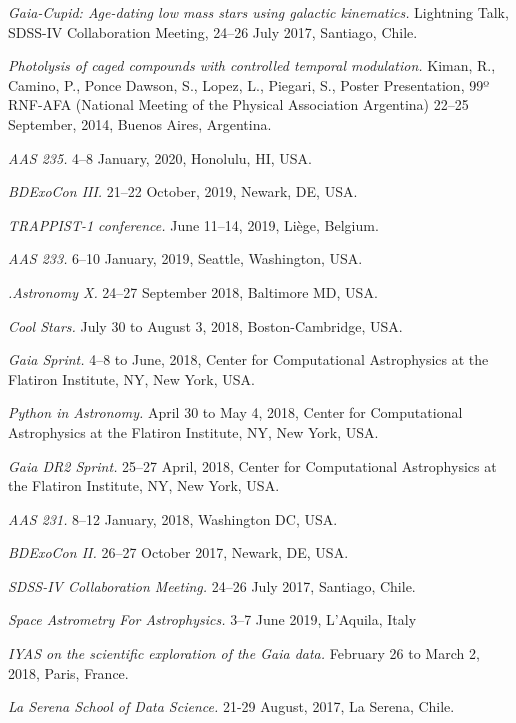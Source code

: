 \documentclass[10pt]{cv}
\begin{document}
\begin{llist}
\textit{Gaia-Cupid: Age-dating low mass stars using galactic kinematics.} Lightning Talk, SDSS-IV Collaboration Meeting, 24--26 July 2017, Santiago, Chile. 

\textit{Photolysis of caged compounds with controlled temporal modulation.} Kiman, R., Camino, P., Ponce Dawson, S., Lopez, L., Piegari, S., Poster Presentation, 99º RNF-AFA (National Meeting of the Physical Association Argentina) 22--25 September, 2014, Buenos Aires, Argentina.

\textit{AAS 235.} 4--8 January, 2020, Honolulu, HI, USA.

\textit{BDExoCon III.} 21--22 October, 2019, Newark, DE, USA.

\textit{TRAPPIST-1 conference.} June 11--14, 2019, Li\`ege, Belgium.

\textit{AAS 233.} 6--10 January, 2019, Seattle, Washington, USA.

\textit{.Astronomy X.} 24--27 September 2018, Baltimore MD, USA.

\textit{Cool Stars.} July 30 to August 3, 2018, Boston-Cambridge, USA.

\textit{Gaia Sprint.} 4--8 to June, 2018, Center for Computational Astrophysics at the Flatiron Institute, NY, New York, USA.

\textit{Python in Astronomy.}  April 30 to May 4, 2018, Center for Computational Astrophysics at the Flatiron Institute, NY, New York, USA. 

\textit{Gaia DR2 Sprint.} 25--27 April, 2018, Center for Computational Astrophysics at the Flatiron Institute, NY, New York, USA. 

\textit{AAS 231.} 8--12 January, 2018, Washington DC, USA.

\textit{BDExoCon II.} 26--27 October 2017, Newark, DE, USA.

\textit{SDSS-IV Collaboration Meeting.} 24--26 July 2017, Santiago, Chile.

\textit{Space Astrometry For Astrophysics.} 3--7 June 2019, L'Aquila, Italy

\textit{IYAS on the scientific exploration of the Gaia data.} February 26 to March 2, 2018, Paris, France.

\textit{La Serena School of Data Science.} 21-29 August, 2017, La Serena, Chile.




\end{llist}
\end{document}
